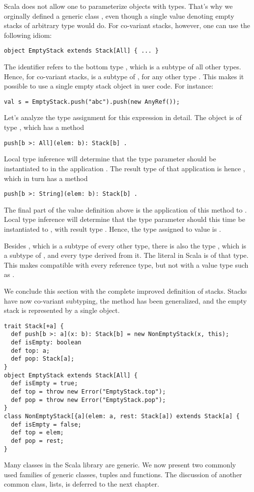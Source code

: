 Scala does not allow one to parameterize objects with types. That's
why we orginally defined a generic class , even
though a single value denoting empty stacks of arbitrary type would
do. For co-variant stacks, however, one can use the following idiom:
\begin{lstlisting}
object EmptyStack extends Stack[All] { ... }
\end{lstlisting}
The identifier  refers to the bottom type ,
which is a subtype of all other types. Hence, for co-variant stacks,
 is a subtype of , for any other type
. This makes it possible to use a single empty stack object
in user code. For instance:
\begin{lstlisting}
val s = EmptyStack.push("abc").push(new AnyRef());
\end{lstlisting}
Let's analyze the type assignment for this expression in detail.  The
 object is of type , which has a
method
\begin{lstlisting}
push[b >: All](elem: b): Stack[b] .
\end{lstlisting}
Local type inference will determine that the type parameter 
should be instantiated to  in the application 
. The result type of that application is hence
, which in turn has a method
\begin{lstlisting}
push[b >: String](elem: b): Stack[b] .
\end{lstlisting}
The final part of the value definition above is the application of
this method to . Local type inference will
determine that the type parameter  should this time be
instantiated to , with result type .
Hence, the type assigned to value  is .

Besides , which is a subtype of every other type,
there is also the type , which is a subtype of
, and every type derived from it. The 
literal in Scala is of that type. This makes  compatible
with every reference type, but not with a value type such as
.

We conclude this section with the complete improved definition of
stacks. Stacks have now co-variant subtyping, the  method
has been generalized, and the empty stack is represented by a single
object.
\begin{lstlisting}
trait Stack[+a] {
  def push[b >: a](x: b): Stack[b] = new NonEmptyStack(x, this);
  def isEmpty: boolean
  def top: a;
  def pop: Stack[a];
}
object EmptyStack extends Stack[All] {
  def isEmpty = true;
  def top = throw new Error("EmptyStack.top");
  def pop = throw new Error("EmptyStack.pop");
}
class NonEmptyStack[{a](elem: a, rest: Stack[a]) extends Stack[a] {
  def isEmpty = false;
  def top = elem;
  def pop = rest;
}
\end{lstlisting}
Many classes in the Scala library are generic. We now present two
commonly used families of generic classes, tuples and functions. The
discussion of another common class, lists, is deferred to the next
chapter.

